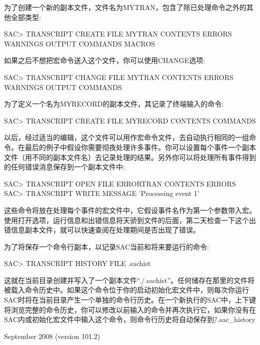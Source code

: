 为了创建一个新的副本文件，文件名为MYTRAN，包含了除已处理命令之外的其他全部类型:
\begin{SACCode}
SAC> TRANSCRIPT CREATE FILE MYTRAN CONTENTS ERRORS WARNINGS OUTPUT COMMANDS MACROS
\end{SACCode}

如果之后不想把宏命令送入这个文件，你可以使用CHANGE选项:
\begin{SACCode}
SAC> TRANSCRIPT CHANGE FILE MYTRAN CONTENTS ERRORS WARNINGS OUTPUT COMMANDS
\end{SACCode}

为了定义一个名为MYRECORD的副本文件，其记录了终端输入的命令:
\begin{SACCode}
SAC> TRANSCRIPT CREATE FILE MYRECORD CONTENTS COMMANDS
\end{SACCode}

以后，经过适当的编辑，这个文件可以用作宏命令文件，去自动执行相同的一组命令。在最后的例子中假设你需要彻夜处理许多事件。你可以设置每个事件一个副本文件（用不同的副本文件名）去记录处理的结果。另外你可以将处理所有事件得到的任何错误消息保存到一个副本文件中:
\begin{SACCode}
SAC> TRANSCRIPT OPEN FILE ERRORTRAN CONTENTS ERRORS
SAC> TRANSCRIPT WRITE MESSAGE 'Processing event 1'
\end{SACCode}

这些命令将放在处理每个事件的宏文件中，它假设事件名作为第一个参数带入宏。使用打开选项，运行信息和出错信息将天骄到文件的后面，第二天检查一下这个出错信息副本文件，就可以快速查阅在处理期间是否出现了错误。

为了将保存一个命令行副本，以记录SAC当前和将来要运行的命令:
\begin{SACCode}
SAC> TRANSCRIPT HISTORY FILE .sachist
\end{SACCode}
这就在当前目录创建并写入了一个副本文件``./.sachist''。任何储存在那里的文件将被载入命令历史中。如果这个命令位于你的启动初始化宏文件中，则每次你运行SAC时将在当前目录产生一个单独的命令行历史。在一个新执行的SAC中，上下键将浏览完整的命令历史，你可以修改以前输入的命令并再次执行它，如果你没有在SAC内或初始化宏文件中输入这个命令，则命令行历史将自动保存到\~/.sac\_history

September 2008 (version 101.2)
